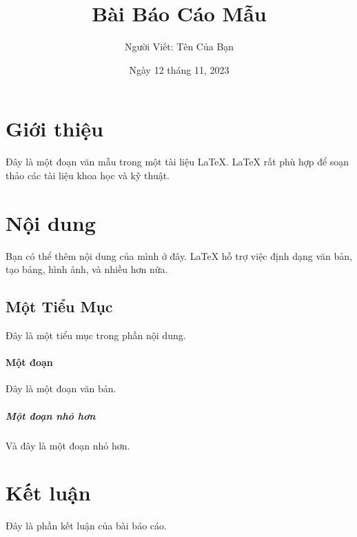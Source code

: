 \documentclass[12pt]{article}
\title{Bài Báo Cáo Mẫu}
\author{Người Viết: Tên Của Bạn}
\date{Ngày 12 tháng 11, 2023}
\begin{document}
\maketitle

\section{Giới thiệu}
Đây là một đoạn văn mẫu trong một tài liệu LaTeX. LaTeX rất phù hợp để soạn thảo các tài liệu khoa học và kỹ thuật.

\section{Nội dung}
Bạn có thể thêm nội dung của mình ở đây. LaTeX hỗ trợ việc định dạng văn bản, tạo bảng, hình ảnh, và nhiều hơn nữa.

\subsection{Một Tiểu Mục}
Đây là một tiểu mục trong phần nội dung.

\paragraph{Một đoạn}
Đây là một đoạn văn bản. 

\subparagraph{Một đoạn nhỏ hơn}
Và đây là một đoạn nhỏ hơn.

\section{Kết luận}
Đây là phần kết luận của bài báo cáo.
\end{document}
